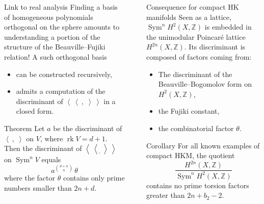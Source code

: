 \documentclass[final]{beamer}
\newlength{\sepwid}
\newlength{\onecolwid}
\DeclareMathOperator{\rank}{rk}
\DeclareMathOperator{\Sym}{Sym}
\newcommand{\bra}{\left<\!\!\!\:\left<}
\newcommand{\ket}{\right>\!\!\!\:\right>}
\newcommand{\Z}{\mathbb{Z}}
\begin{document}
\begin{frame}[t]
\begin{columns}[t]
\begin{column}{\onecolwid}
\begin{block}{Link to real analysis}
Finding a basis of homogeneous polynomials orthogonal on the sphere amounts to understanding a portion of the structure of the Beauville--Fujiki relation! A such orthogonal basis
\begin{itemize}
 \item can be constructed recursively,
 \item admits a computation of the discriminant of $\bra\ ,\;\ket$ in a closed form.
\end{itemize}
\end{block}
\begin{alertblock}{Theorem}
Let $a$ be the discriminant of $\left<\ ,\;\right>$ on $V$, where $\rank V=d+1$.
Then the discriminant of $\bra_ ,\;\ket$ on $\Sym^nV $ equals
$$
a^{\binom{d+n}{n}}\, \theta
$$ 
where the factor $\theta$ contains only prime numbers smaller than $2n+d$.
\end{alertblock}


\end{column} %

\begin{column}{\sepwid}\end{column} %

\begin{column}{\onecolwid} %


\begin{block}{Consequence for compact HK manifolds}
Seen as a lattice, $\Sym^n\!H^2(X,\Z)$ is embedded in the unimodular Poincar\'e lattice $H^{2n}(X,\Z)$. Its discriminant is composed of factors coming from:
\begin{itemize}
 \item The discriminant of the Beauville--Bogomolov form on $H^2(X,\Z)$,
\item the Fujiki constant,
\item the combinatorial factor $\theta$.
\end{itemize}
\vspace{-5mm}
\end{block}
\begin{alertblock}{Corollary}
For all known examples of compact HKM, the quotient
$$
\frac{H^{2n}(X,\Z)}{\Sym^n\!H^2(X,\Z)}
$$
contains no prime torsion factors greater than $2n +b_2-2$.
\end{alertblock}





\end{column}
\end{columns}
\end{frame}
\end{document}

